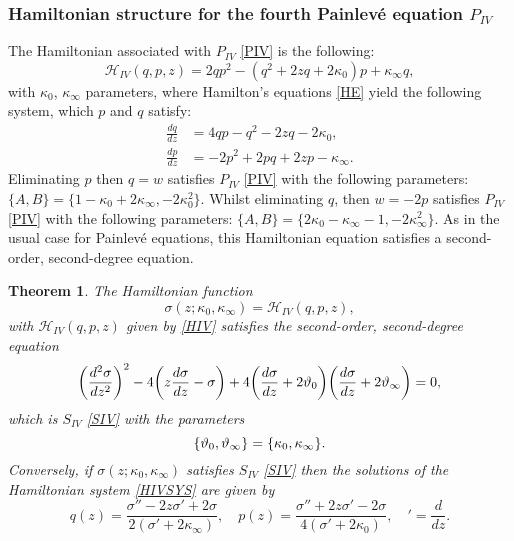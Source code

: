 \documentclass[12pt]{article}
\def\P{Painlev\'e }
\newtheorem{mydef}{Theorem}[section]
\numberwithin{figure}{section}
\numberwithin{equation}{section}
\numberwithin{table}{section}
\begin{document}
\subsubsection{Hamiltonian structure for the fourth \P equation $P_{IV}$}
The Hamiltonian associated with $P_{IV}$ \eqref{PIV} is the following:
\begin{equation}
\mathcal{H}_{IV}(q,p,z)=2qp^2-(q^2+2zq+2\kappa_0)p+\kappa_{\infty}q,\label{HIV}
\end{equation}
with $\kappa_0$, $\kappa_{\infty}$ parameters, where Hamilton's equations \eqref{HE} yield the following system, which $p$ and $q$ satisfy:
\begin{subequations}\label{HIVSYS}
\begin{align}
\frac{dq}{dz}&=4qp-q^2-2zq-2\kappa_0,\label{HIV1}\\
\frac{dp}{dz}&=-2p^2+2pq+2zp-\kappa_{\infty}.\label{HIV2}
\end{align}
\end{subequations}
Eliminating $p$ then $q=w$ satisfies $P_{IV}$ \eqref{PIV} with the following parameters:
$\{A,B\}=\{1-\kappa_0+2\kappa_{\infty},-2\kappa_{0}^2\}$. Whilst eliminating $q$, then $w=-2p$ satisfies $P_{IV}$ \eqref{PIV} with the following parameters:
$\{A,B\}=\{2\kappa_0-\kappa_{\infty}-1,-2\kappa_{\infty}^2\}$.
As in the usual case for \P equations, this Hamiltonian equation satisfies a second-order, second-degree equation.
\begin{mydef} The Hamiltonian function
\begin{equation}
\sigma(z;\kappa_0,\kappa_\infty)=\mathcal{H}_{IV}(q,p,z),\label{HA4}
\end{equation}
with $\mathcal{H}_{IV}(q,p,z)$ given by \eqref{HIV} satisfies the second-order, second-degree equation
$$
\bigg(\frac{d^2\sigma}{dz^2}\bigg)^2-4\bigg(z\frac{d\sigma}{dz}-\sigma\bigg)+4\bigg(\frac{d\sigma}{dz}+2\vartheta_0\bigg)\bigg(\frac{d\sigma}{dz}+2\vartheta_\infty\bigg)=0,
$$
which is $S_{IV}$ \eqref{SIV} with the parameters
$$\{\vartheta_0,\vartheta_\infty\}=\{\kappa_0,\kappa_\infty\}.$$
Conversely, if $\sigma(z;\kappa_0,\kappa_\infty)$ satisfies $S_{IV}$ \eqref{SIV} then the solutions of the Hamiltonian system \eqref{HIVSYS} are given by
\begin{equation}\label{PIVpandq}
q(z)=\frac { \sigma''-2z\sigma'+2\sigma}{ 2(\sigma'+2\kappa_\infty)},\quad
p(z)={\frac { \sigma''+2z\sigma'-2\sigma }{ 4(\sigma'+2\kappa_0)}},\quad'=\frac{d}{dz}.
\end{equation}
\end{mydef}
\end{document}
